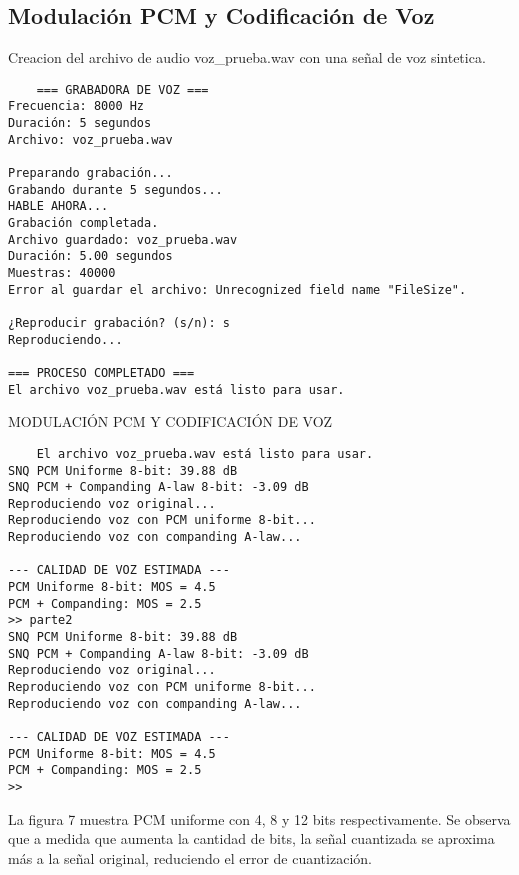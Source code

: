 \documentclass[journal]{IEEEtran} %
\begin{document}
\subsection{Modulación PCM y Codificación de Voz}
Creacion del archivo de audio voz\_prueba.wav con una señal de voz sintetica.
\begin{verbatim}
    === GRABADORA DE VOZ ===
Frecuencia: 8000 Hz
Duración: 5 segundos
Archivo: voz_prueba.wav

Preparando grabación...
Grabando durante 5 segundos...
HABLE AHORA...
Grabación completada.
Archivo guardado: voz_prueba.wav
Duración: 5.00 segundos
Muestras: 40000
Error al guardar el archivo: Unrecognized field name "FileSize".

¿Reproducir grabación? (s/n): s
Reproduciendo...

=== PROCESO COMPLETADO ===
El archivo voz_prueba.wav está listo para usar.

\end{verbatim}

MODULACIÓN PCM Y CODIFICACIÓN DE VOZ
\begin{verbatim}
    El archivo voz_prueba.wav está listo para usar.
SNQ PCM Uniforme 8-bit: 39.88 dB
SNQ PCM + Companding A-law 8-bit: -3.09 dB
Reproduciendo voz original...
Reproduciendo voz con PCM uniforme 8-bit...
Reproduciendo voz con companding A-law...

--- CALIDAD DE VOZ ESTIMADA ---
PCM Uniforme 8-bit: MOS = 4.5
PCM + Companding: MOS = 2.5
>> parte2
SNQ PCM Uniforme 8-bit: 39.88 dB
SNQ PCM + Companding A-law 8-bit: -3.09 dB
Reproduciendo voz original...
Reproduciendo voz con PCM uniforme 8-bit...
Reproduciendo voz con companding A-law...

--- CALIDAD DE VOZ ESTIMADA ---
PCM Uniforme 8-bit: MOS = 4.5
PCM + Companding: MOS = 2.5
>> 

\end{verbatim}

La figura 7 muestra PCM uniforme con 4, 8 y 12 bits respectivamente. Se observa que a medida que aumenta la cantidad de bits, la señal cuantizada se aproxima más a la señal original, reduciendo el error de cuantización.

\end{document}
